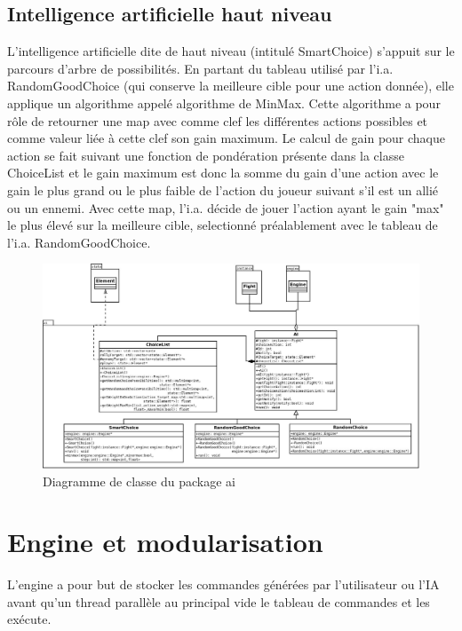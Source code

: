 \documentclass[12pt,a4paper]{report}
\begin{document}
\section{Intelligence artificielle haut niveau}

L'intelligence artificielle dite de haut niveau (intitul\'{e} SmartChoice) s'appuit sur le parcours d'arbre de possibilit\'{e}s. En partant du tableau utilis\'{e} par l'i.a. RandomGoodChoice (qui conserve la meilleure cible pour une action donn\'{e}e), elle applique un algorithme appel\'{e} algorithme de MinMax. Cette algorithme a pour r\^{o}le de retourner une map avec comme clef les diff\'{e}rentes actions possibles et comme valeur li\'{e}e \`{a} cette clef son gain maximum. Le calcul de gain pour chaque action se fait suivant une fonction de pond\'{e}ration pr\'{e}sente dans la classe ChoiceList et le gain maximum est donc la somme du gain d'une action avec le gain le plus grand ou le plus faible de l'action du joueur suivant s'il est un alli\'{e} ou un ennemi. Avec cette map, l'i.a. d\'{e}cide de jouer l'action ayant le gain "max" le plus \'{e}lev\'{e} sur la meilleure cible, selectionn\'{e} pr\'{e}alablement avec le tableau de l'i.a. RandomGoodChoice. 

\begin{figure}
\caption{Diagramme de classe du package ai}
\includegraphics[width=1\textwidth]{ai.jpeg}
\end{figure}

\chapter{Engine et modularisation}

L'engine a pour but de stocker les commandes g\'{e}n\'{e}r\'{e}es par l'utilisateur ou l'IA avant qu'un thread parall\`{e}le au principal vide le tableau de commandes et les ex\'{e}cute.
\end{document}
